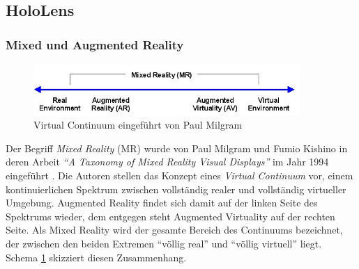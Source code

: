 \subsection{HoloLens}
\label{sec-2-1}
\begin{center}
\end{center}

\subsubsection{Mixed und Augmented Reality}
\label{sec-2-1-1}

\begin{figure}[h!]
	\centering
	\includegraphics[width=0.9\textwidth]{images/virtual_continuum.png}
	\caption{Virtual Continuum eingeführt von Paul Milgram \cite{Milgram94}}
	\label{img:virtual_continuum}
\end{figure}

Der Begriff \textit{Mixed Reality} (MR) wurde von Paul Milgram und Fumio Kishino in deren Arbeit \textit{``A Taxonomy of Mixed Reality Visual Displays''} im Jahr 1994 eingeführt \cite{Milgram94}. Die Autoren stellen das Konzept eines \textit{Virtual Continuum} vor, einem kontinuierlichen Spektrum zwischen vollständig realer und vollständig virtueller Umgebung. Augmented Reality findet sich damit auf der linken Seite des Spektrums wieder, dem entgegen steht Augmented Virtuality auf der rechten Seite. Als Mixed Reality wird der gesamte Bereich des Continuums bezeichnet, der zwischen den beiden Extremen ``völlig real'' und ``völlig virtuell'' liegt. Schema \ref{img:virtual_continuum} skizziert diesen Zusammenhang.\\

